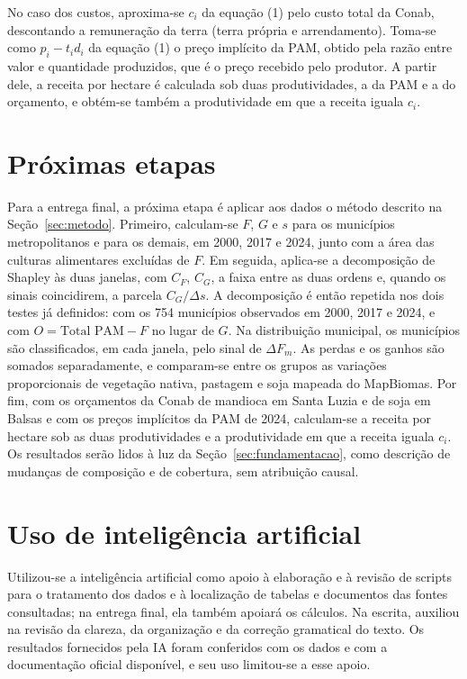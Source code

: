 \documentclass[11pt,a4paper]{article}
\begin{document}
No caso dos custos, aproxima-se $c_i$ da equação (1) pelo custo total da Conab, descontando a remuneração da terra (terra própria e arrendamento). Toma-se como $p_i - t_i d_i$ da equação (1) o preço implícito da PAM, obtido pela razão entre valor e quantidade produzidos, que é o preço recebido pelo produtor. A partir dele, a receita por hectare é calculada sob duas produtividades, a da PAM e a do orçamento, e obtém-se também a produtividade em que a receita iguala $c_i$.

\section{Próximas etapas}

Para a entrega final, a próxima etapa é aplicar aos dados o método descrito na Seção~\ref{sec:metodo}. Primeiro, calculam-se $F$, $G$ e $s$ para os municípios metropolitanos e para os demais, em 2000, 2017 e 2024, junto com a área das culturas alimentares excluídas de $F$. Em seguida, aplica-se a decomposição de Shapley às duas janelas, com $C_F$, $C_G$, a faixa entre as duas ordens e, quando os sinais coincidirem, a parcela $C_G/\Delta s$. A decomposição é então repetida nos dois testes já definidos: com os 754 municípios observados em 2000, 2017 e 2024, e com $O = \text{Total PAM} - F$ no lugar de $G$. Na distribuição municipal, os municípios são classificados, em cada janela, pelo sinal de $\Delta F_m$. As perdas e os ganhos são somados separadamente, e comparam-se entre os grupos as variações proporcionais de vegetação nativa, pastagem e soja mapeada do MapBiomas. Por fim, com os orçamentos da Conab de mandioca em Santa Luzia e de soja em Balsas e com os preços implícitos da PAM de 2024, calculam-se a receita por hectare sob as duas produtividades e a produtividade em que a receita iguala $c_i$. Os resultados serão lidos à luz da Seção~\ref{sec:fundamentacao}, como descrição de mudanças de composição e de cobertura, sem atribuição causal.

\section*{Uso de inteligência artificial}

Utilizou-se a inteligência artificial como apoio à elaboração e à revisão de scripts para o tratamento dos dados e à localização de tabelas e documentos das fontes consultadas; na entrega final, ela também apoiará os cálculos. Na escrita, auxiliou na revisão da clareza, da organização e da correção gramatical do texto. Os resultados fornecidos pela IA foram conferidos com os dados e com a documentação oficial disponível, e seu uso limitou-se a esse apoio.
\end{document}
